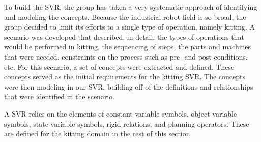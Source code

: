 To build the SVR, the group has taken a very systematic approach of identifying and modeling the concepts. Because the industrial robot field is so broad, the group decided to limit its efforts to a single type of operation, namely kitting. A scenario was developed that described, in detail, the types of operations that would be performed in kitting, the sequencing of steps, the parts and machines that were needed, constraints on the process such as pre- and post-conditions, etc. For this scenario, a set of concepts were extracted and defined. These concepts served as the initial requirements for the kitting SVR. The concepts were then modeling in our SVR, building off of the definitions and relationships that were identified in the scenario.

A SVR relies on the elements of constant variable symbols, object variable symbols, state variable symbols, rigid relations, and planning operators. These are defined for the kitting domain in the rest of this section.

